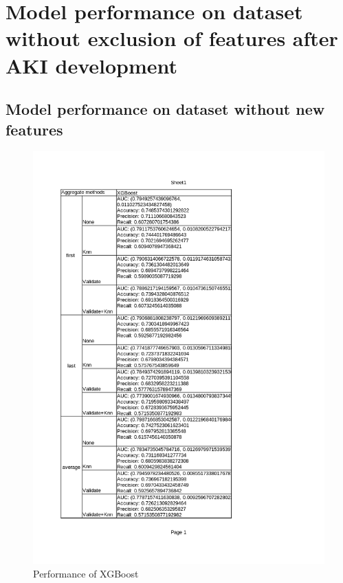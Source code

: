 \documentclass[../main.tex]{subfiles}
\begin{document}
\section{Model performance on dataset without exclusion of features after AKI development}


\subsection{Model performance on dataset without new features}

 \begin{figure}[H]
    \centering
    \includegraphics[width=\textwidth]{Figure/KidneyResultNoLimit_XGBoost.png}
    \caption{Performance of XGBoost}
    \label{fig:KidneyResultNoLimit_XGBoost}
\end{figure}
\end{document}
